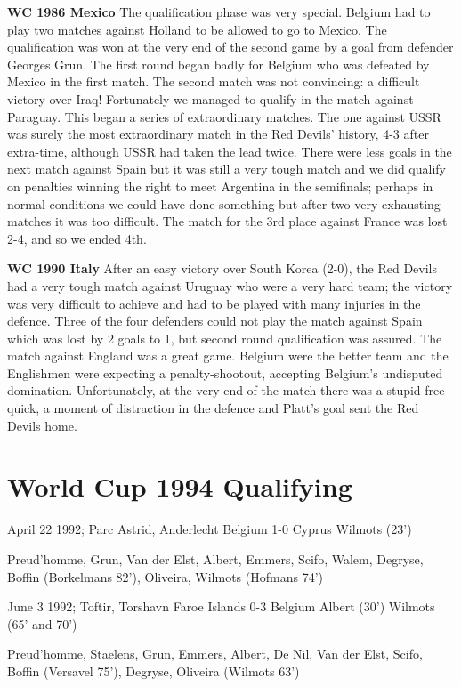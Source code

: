 \textbf{WC 1986 Mexico}
The qualification phase was very special. Belgium had to play two matches
against Holland to be allowed to go to Mexico. The qualification was won at
the very end of the second game by a goal from defender Georges Grun. 
The first round began badly for Belgium who was defeated by Mexico in the
first match. The second match was not convincing: a difficult victory over
Iraq! Fortunately we managed to qualify in the match against Paraguay. This
began a series of extraordinary matches. The one against USSR was surely
the most extraordinary match in the Red Devils' history, 4-3 after extra-time,
although USSR had taken the lead twice. There were less goals in the next
match against Spain but it was still a very tough match and we did qualify
on penalties winning the right to meet Argentina in the semifinals; perhaps in
normal conditions we could have done something but after two very exhausting 
matches it was too difficult. The match for the 3rd place against France was 
lost 2-4, and so we ended 4th.

\textbf{WC 1990 Italy}
After an easy victory over South Korea (2-0), the Red Devils had a very tough
match against Uruguay who were a very hard team; the victory was very difficult 
to achieve and had to be played with many injuries in the defence. Three of the 
four defenders could not play the match against Spain which was lost by 2 goals
to 1, but second round qualification was assured. The match against England was 
a great game. Belgium were the better team and the Englishmen were expecting 
a penalty-shootout, accepting Belgium's undisputed domination. Unfortunately, 
at the very end of the match there was a stupid free quick, a moment of 
distraction in the defence and Platt's goal sent the Red Devils home.
\section{World Cup 1994 Qualifying}
April 22 1992; Parc Astrid, Anderlecht
Belgium  1-0      Cyprus  
Wilmots (23')

Preud'homme, Grun, Van der Elst, Albert, Emmers, Scifo, Walem, Degryse, 
Boffin (Borkelmans 82'), Oliveira, Wilmots (Hofmans 74')

June 3 1992; Toftir, Torshavn
Faroe Islands  0-3      Belgium 
Albert (30') Wilmots (65' and 70')

Preud'homme, Staelens, Grun, Emmers, Albert, De Nil, Van der Elst, Scifo, 
Boffin (Versavel 75'), Degryse, Oliveira (Wilmots 63')

